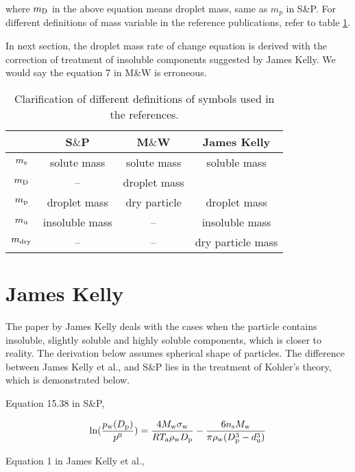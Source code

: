 \documentclass[12pt]{article}
\begin{document}
where $m_{\rm D}$ in the above equation means droplet mass, same as $m_{p}$ in S\&P. For different definitions of mass variable in the reference publications, refer to table \ref{table:1}. 

In next section, the droplet mass rate of change equation is derived with the correction of treatment of insoluble components suggested by James Kelly. We would say the equation 7 in M\&W is erroneous.



\begin{table}\label{table:1}
\caption{Clarification of different definitions of symbols used in the references.}
\begin{center}
\begin{tabular}{cccc} \hline
   & S$\&$P  &  M$\&$W   & James Kelly \\ \hline
$m_{\rm s}$  &   solute mass  & solute mass  &   soluble mass \\ 
$m_{\rm D}$  & --  &  droplet mass  &   \\ 
$m_{\rm p}$  & droplet mass  &  dry particle &  droplet mass \\ 
$m_{\rm u}$  & insoluble mass  & -- & insoluble mass \\ 
$m_{\rm dry}$ &  -- & -- & dry particle mass \\ \hline
\end{tabular}
\end{center}
\end{table}


\section{James Kelly}

The paper by James Kelly deals with the cases when the particle contains insoluble, slightly soluble and  highly soluble components, which is closer to reality. The derivation below assumes spherical shape of particles. The difference between James Kelly et al., and S\&P lies in the treatment of Kohler's theory, which is demonstrated below.

Equation 15.38 in S\&P, 

\begin{equation}\label{eqn:36}
\ln(\frac{p_{\rm w}(D_{\rm p})}{p^{\rm 0}})=\frac{4M_{\rm w}\sigma_{\rm w}}{RT_{\rm a}\rho_{\rm w} D_{\rm p}}-\frac{6n_{\rm s}M_{\rm w}}{\pi\rho_{\rm w}(D_{\rm p}^{3}-d_{\rm u}^{3})}
\end{equation}

Equation 1 in James Kelly et al., 
\end{document}
